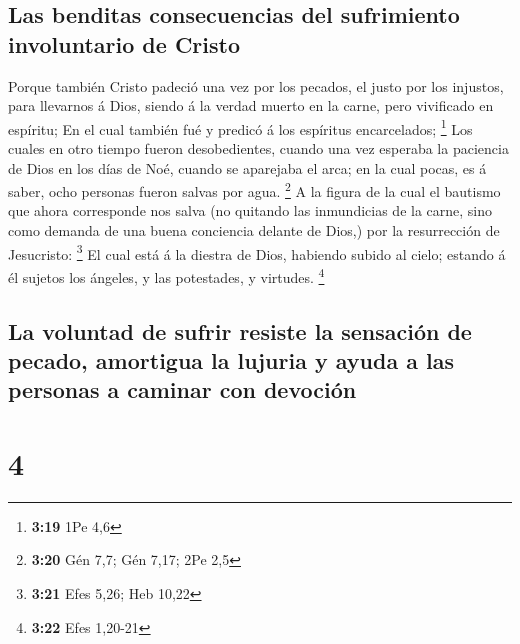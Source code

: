 \hypertarget{las-benditas-consecuencias-del-sufrimiento-involuntario-de-cristo}{%
\subsection{Las benditas consecuencias del sufrimiento involuntario de
Cristo}\label{las-benditas-consecuencias-del-sufrimiento-involuntario-de-cristo}}

 Porque también Cristo padeció una vez por los pecados,
el justo por los injustos, para llevarnos á Dios, siendo á la verdad
muerto en la carne, pero vivificado en espíritu;  En el
cual también fué y predicó á los espíritus encarcelados; \footnote{\textbf{3:19}
  1Pe 4,6}  Los cuales en otro tiempo fueron
desobedientes, cuando una vez esperaba la paciencia de Dios en los días
de Noé, cuando se aparejaba el arca; en la cual pocas, es á saber, ocho
personas fueron salvas por agua. \footnote{\textbf{3:20} Gén 7,7; Gén
  7,17; 2Pe 2,5}  A la figura de la cual el bautismo que
ahora corresponde nos salva (no quitando las inmundicias de la carne,
sino como demanda de una buena conciencia delante de Dios,) por la
resurrección de Jesucristo: \footnote{\textbf{3:21} Efes 5,26; Heb 10,22}
 El cual está á la diestra de Dios, habiendo subido al
cielo; estando á él sujetos los ángeles, y las potestades, y virtudes.
\footnote{\textbf{3:22} Efes 1,20-21}

\hypertarget{la-voluntad-de-sufrir-resiste-la-sensaciuxf3n-de-pecado-amortigua-la-lujuria-y-ayuda-a-las-personas-a-caminar-con-devociuxf3n}{%
\subsection{La voluntad de sufrir resiste la sensación de pecado,
amortigua la lujuria y ayuda a las personas a caminar con
devoción}\label{la-voluntad-de-sufrir-resiste-la-sensaciuxf3n-de-pecado-amortigua-la-lujuria-y-ayuda-a-las-personas-a-caminar-con-devociuxf3n}}

\hypertarget{section-3}{%
\section{4}\label{section-3}}

